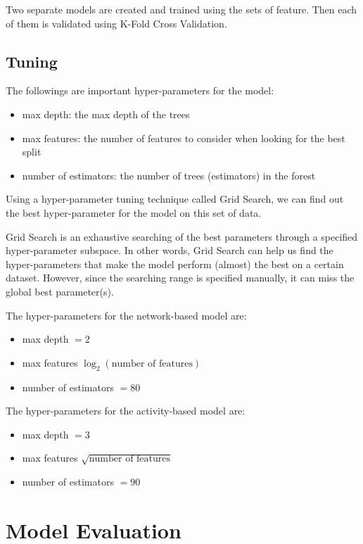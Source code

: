 \documentclass{mcmthesis}
\begin{document}
Two separate models are created and trained using the sets of feature. Then each of them is validated using K-Fold Cross Validation.

\subsection{Tuning}
The followings are important hyper-parameters for the model:

\begin{itemize}
    \item max depth: the max depth of the trees
    \item max features: the number of features to consider when looking for the best split
    \item number of estimators: the number of trees (estimators) in the forest
\end{itemize}

Using a hyper-parameter tuning technique called Grid Search, we can find out
the best hyper-parameter for the model on this set of data.

Grid Search is an exhaustive searching of the best parameters through a specified hyper-parameter subspace. In other words, Grid Search can help us
find the hyper-parameters that make the model perform (almost) the best on a certain dataset. However, since the searching range is specified manually,
it can miss the global best parameter(s).

The hyper-parameters for the network-based model are:

\begin{itemize}
    \item max depth $ = 2$
    \item max features $\log_2(\text{number of features})$
    \item number of estimators $= 80$
\end{itemize}


The hyper-parameters for the activity-based model are:

\begin{itemize}
    \item max depth $ = 3$
    \item max features $\sqrt{\text{number of features}}$
    \item number of estimators $= 90$
\end{itemize}

\section{Model Evaluation}
\end{document}
